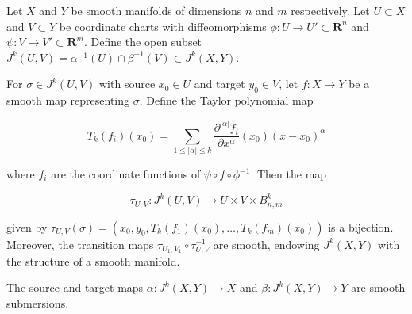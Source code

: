 Let $X$ and $Y$ be smooth manifolds of dimensions $n$ and $m$ respectively. Let $U \subset X$ and $V \subset Y$ be coordinate charts with diffeomorphisms $\phi: U \to U' \subset \mathbf{R}^n$ and $\psi: V \to V' \subset \mathbf{R}^m$. Define the open subset $J^k(U, V) = \alpha^{-1}(U) \cap \beta^{-1}(V) \subset J^k(X, Y)$.

For $\sigma \in J^k(U, V)$ with source $x_0 \in U$ and target $y_0 \in V$, let $f: X \to Y$ be a smooth map representing $\sigma$. Define the Taylor polynomial map

$$T_k(f_i)(x_0) = \sum_{1 \leq |\alpha| \leq k} \frac{\partial^{|\alpha|} f_i}{\partial x^\alpha}(x_0) (x - x_0)^\alpha$$

where $f_i$ are the coordinate functions of $\psi \circ f \circ \phi^{-1}$. Then the map

$$\tau_{U,V}: J^k(U, V) \to U \times V \times B_{n,m}^k$$

given by $\tau_{U,V}(\sigma) = (x_0, y_0, T_k(f_1)(x_0), \ldots, T_k(f_m)(x_0))$ is a bijection. Moreover, the transition maps $\tau_{U_1,V_1} \circ \tau_{U,V}^{-1}$ are smooth, endowing $J^k(X, Y)$ with the structure of a smooth manifold.

The source and target maps $\alpha: J^k(X, Y) \to X$ and $\beta: J^k(X, Y) \to Y$ are smooth submersions.
